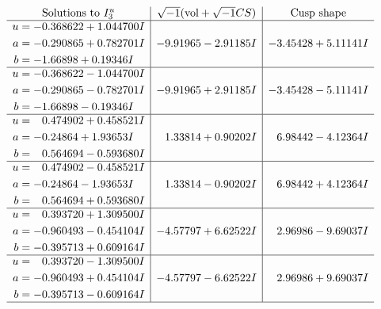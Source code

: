 \documentclass[1p]{elsarticle_modified}
\theoremstyle{definition}
\newcommand{\I}{\sqrt{-1}}
\begin{document}
$$\begin{array}{c|c|c}  
\text{Solutions to }I^u_{3}& \I (\text{vol} + \sqrt{-1}CS) & \text{Cusp shape}\\
 \hline 
\begin{aligned}
u &= -0.368622 + 1.044700 I \\
a &= -0.290865 + 0.782701 I \\
b &= -1.66898 + 0.19346 I\end{aligned}
 & -9.91965 - 2.91185 I & -3.45428 + 5.11141 I \\ \hline\begin{aligned}
u &= -0.368622 - 1.044700 I \\
a &= -0.290865 - 0.782701 I \\
b &= -1.66898 - 0.19346 I\end{aligned}
 & -9.91965 + 2.91185 I & -3.45428 - 5.11141 I \\ \hline\begin{aligned}
u &= \phantom{-}0.474902 + 0.458521 I \\
a &= -0.24864 + 1.93653 I \\
b &= \phantom{-}0.564694 - 0.593680 I\end{aligned}
 & \phantom{-}1.33814 + 0.90202 I & \phantom{-}6.98442 - 4.12364 I \\ \hline\begin{aligned}
u &= \phantom{-}0.474902 - 0.458521 I \\
a &= -0.24864 - 1.93653 I \\
b &= \phantom{-}0.564694 + 0.593680 I\end{aligned}
 & \phantom{-}1.33814 - 0.90202 I & \phantom{-}6.98442 + 4.12364 I \\ \hline\begin{aligned}
u &= \phantom{-}0.393720 + 1.309500 I \\
a &= -0.960493 - 0.454104 I \\
b &= -0.395713 + 0.609164 I\end{aligned}
 & -4.57797 + 6.62522 I & \phantom{-}2.96986 - 9.69037 I \\ \hline\begin{aligned}
u &= \phantom{-}0.393720 - 1.309500 I \\
a &= -0.960493 + 0.454104 I \\
b &= -0.395713 - 0.609164 I\end{aligned}
 & -4.57797 - 6.62522 I & \phantom{-}2.96986 + 9.69037 I\\
 \hline 
 \end{array}$$\newpage\newpage\renewcommand{\arraystretch}{1}
\end{document}
